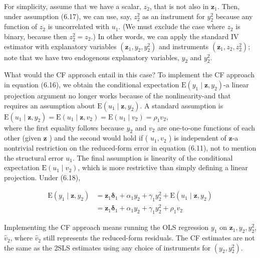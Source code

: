 \documentclass[10pt]{article}
\begin{document}
For simplicity, assume that we have a scalar, $z_{2}$, that is not also in $\mathbf{z}_{1}$. Then, under assumption (6.17), we can use, say, $z_{2}^{2}$ as an instrument for $y_{2}^{2}$ because any function of $z_{2}$ is uncorrelated with $u_{1}$. (We must exclude the case where $z_{2}$ is binary, because then $z_{2}^{2}=z_{2}$.) In other words, we can apply the standard IV estimator with explanatory variables $\left(\mathbf{z}_{1}, y_{2}, y_{2}^{2}\right)$ and instruments $\left(\mathbf{z}_{1}, z_{2}, z_{2}^{2}\right)$; note that we have two endogenous explanatory variables, $y_{2}$ and $y_{2}^{2}$.

What would the CF approach entail in this case? To implement the CF approach in equation (6.16), we obtain the conditional expectation $\mathrm{E}\left(y_{1} \mid \mathbf{z}, y_{2}\right)$-a linear projection argument no longer works because of the nonlinearity-and that requires an assumption about $\mathrm{E}\left(u_{1} \mid \mathbf{z}, y_{2}\right)$. A standard assumption is\\
$\mathrm{E}\left(u_{1} \mid \mathbf{z}, y_{2}\right)=\mathrm{E}\left(u_{1} \mid \mathbf{z}, v_{2}\right)=\mathrm{E}\left(u_{1} \mid v_{2}\right)=\rho_{1} v_{2}$,\\
where the first equality follows because $y_{2}$ and $v_{2}$ are one-to-one functions of each other (given $\mathbf{z}$ ) and the second would hold if ( $u_{1}, v_{2}$ ) is independent of $\mathbf{z}$-a nontrivial restriction on the reduced-form error in equation (6.11), not to mention the structural error $u_{1}$. The final assumption is linearity of the conditional expectation $\mathrm{E}\left(u_{1} \mid v_{2}\right)$, which is more restrictive than simply defining a linear projection. Under (6.18),


\begin{align*}
\mathrm{E}\left(y_{1} \mid \mathbf{z}, y_{2}\right) & =\mathbf{z}_{1} \boldsymbol{\delta}_{1}+\alpha_{1} y_{2}+\gamma_{1} y_{2}^{2}+\mathrm{E}\left(u_{1} \mid \mathbf{z}, y_{2}\right) \\
& =\mathbf{z}_{1} \boldsymbol{\delta}_{1}+\alpha_{1} y_{2}+\gamma_{1} y_{2}^{2}+\rho_{1} v_{2} \tag{6.19}
\end{align*}


Implementing the CF approach means running the OLS regression $y_{1}$ on $\mathbf{z}_{1}, y_{2}, y_{2}^{2}$, $\hat{v}_{2}$, where $\hat{v}_{2}$ still represents the reduced-form residuals. The CF estimates are not the same as the 2SLS estimates using any choice of instruments for $\left(y_{2}, y_{2}^{2}\right)$.
\end{document}
